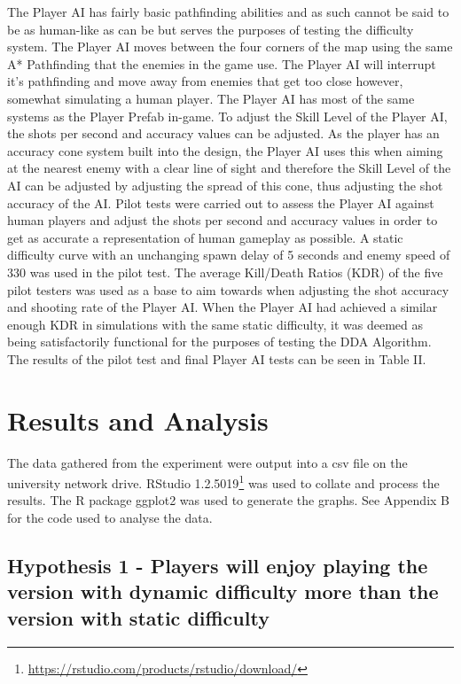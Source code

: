 \documentclass[journal]{IEEEtran}
\begin{document}
The Player AI has fairly basic pathfinding abilities and as such cannot be said to be as human-like as can be but serves the purposes of testing the difficulty system. The Player AI moves between the four corners of the map using the same A* Pathfinding that the enemies in the game use. The Player AI will interrupt it's pathfinding and move away from enemies that get too close however, somewhat simulating a human player. The Player AI has most of the same systems as the Player Prefab in-game. To adjust the Skill Level of the Player AI, the shots per second and accuracy values can be adjusted. As the player has an accuracy cone system built into the design, the Player AI uses this when aiming at the nearest enemy with a clear line of sight and therefore the Skill Level of the AI can be adjusted by adjusting the spread of this cone, thus adjusting the shot accuracy of the AI. Pilot tests were carried out to assess the Player AI against human players and adjust the shots per second and accuracy values in order to get as accurate a representation of human gameplay as possible. A static difficulty curve with an unchanging spawn delay of 5 seconds and enemy speed of 330 was used in the pilot test. The average Kill/Death Ratios (KDR) of the five pilot testers was used as a base to aim towards when adjusting the shot accuracy and shooting rate of the Player AI. When the Player AI had achieved a similar enough KDR in simulations with the same static difficulty, it was deemed as being satisfactorily functional for the purposes of testing the DDA Algorithm. The results of the pilot test and final Player AI tests can be seen in Table II.



\section{Results and Analysis}

The data gathered from the experiment were output into a csv file on the university network drive. RStudio 1.2.5019\footnote{\url{https://rstudio.com/products/rstudio/download/}} was used to collate and process the results. The R package ggplot2 was used to generate the graphs. See Appendix B for the code used to analyse the data. 

\subsection{Hypothesis 1 - Players will enjoy playing the version with dynamic difficulty more than the version with static difficulty}
\end{document}
